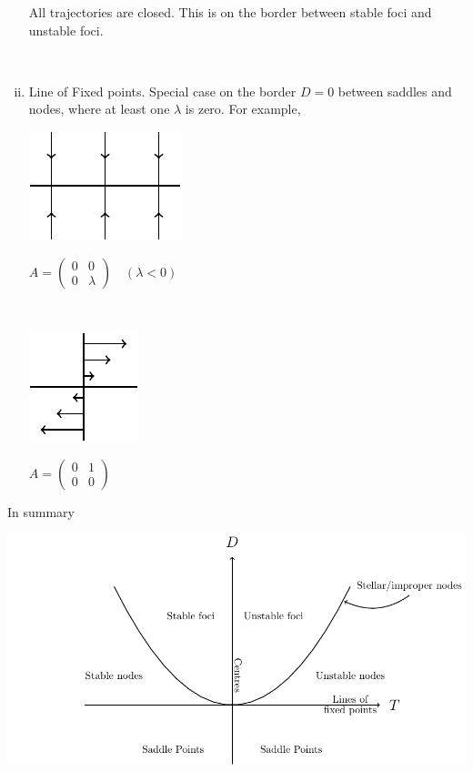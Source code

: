 \documentclass{article}
\begin{document}
\begin{enumerate}[(i)]
\begin{minipage}[c][0.2\textwidth][c]{0.25\textwidth}
\end{minipage}
\begin{minipage}[c][0.2\textwidth][c]{0.65\textwidth}
All trajectories are closed. This is on the border between stable foci and
unstable foci.
\end{minipage}
\\
\item Line of Fixed points. Special case on the border $D=0$ between saddles and
nodes, where at least one $\lambda$ is zero. For example, 
\\
\begin{minipage}[c][0.2\textwidth][c]{0.25\textwidth}
\includegraphics{Fig13.pdf}
\end{minipage}
\begin{minipage}[c][0.2\textwidth][c]{0.65\textwidth}
$ A = \left( \begin{array}{cc}
		0 & 0 \\
		 0 & \lambda \end{array} \right)   \quad(\lambda < 0) $
\end{minipage}
\\
\begin{minipage}[c][0.2\textwidth][c]{0.25\textwidth}
\includegraphics{Fig14.pdf}
\end{minipage}
\begin{minipage}[c][0.2\textwidth][c]{0.65\textwidth}
$ A = \left( \begin{array}{cc}
		0 & 1 \\
		 0 & 0 \end{array} \right)  $ 
\end{minipage}
\end{enumerate}
In summary 
\begin{center}
\includegraphics{Fig15.pdf}
\end{center}
\end{document}
